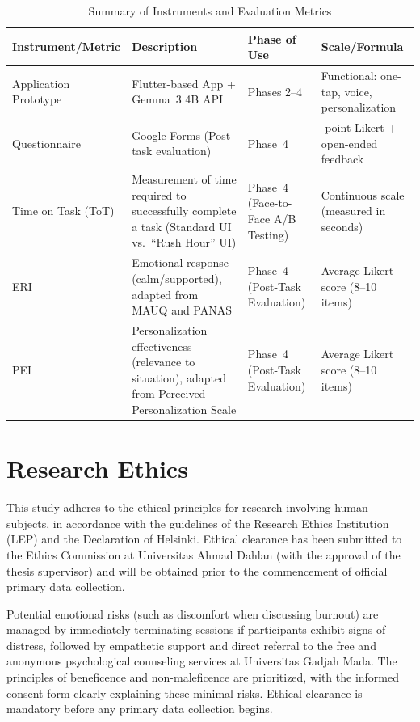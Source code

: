 \begin{table}[htbp]
    \centering
    \small
    \setlength{\tabcolsep}{4pt}
    \renewcommand{\arraystretch}{1.15}
    \caption{Summary of Instruments and Evaluation Metrics}
    \label{tab:instruments}
    \begin{tabular}{>{\raggedright\arraybackslash}p{} >{\raggedright\arraybackslash}p{} >{\raggedright\arraybackslash}p{} >{\raggedright\arraybackslash}p{}}
    \hline
    \textbf{Instrument/Metric} & \textbf{Description} & \textbf{Phase of Use} & \textbf{Scale/Formula} \\
    \hline \hline
    Application Prototype & Flutter-based App + Gemma~3 4B API & Phases 2--4 & Functional: one-tap, voice, personalization \\
    \hline
    Questionnaire & Google Forms (Post-task evaluation) & Phase~4 & 5-point Likert + open-ended feedback \\
    \hline
    Time on Task (ToT) & Measurement of time required to successfully complete a task (Standard UI vs.\ ``Rush Hour'' UI) & Phase~4 (Face-to-Face A/B Testing) & Continuous scale (measured in seconds) \\
    \hline
    ERI & Emotional response (calm/supported), adapted from MAUQ and PANAS & Phase~4 (Post-Task Evaluation) & Average Likert score (8--10 items) \\
    \hline
    PEI & Personalization effectiveness (relevance to situation), adapted from Perceived Personalization Scale & Phase~4 (Post-Task Evaluation) & Average Likert score (8--10 items) \\
    \hline
    \end{tabular}
\end{table}

\section{Research Ethics}

This study adheres to the ethical principles for research involving human subjects, in accordance with the guidelines of the Research Ethics Institution (LEP) and the Declaration of Helsinki. Ethical clearance has been submitted to the Ethics Commission at Universitas Ahmad Dahlan (with the approval of the thesis supervisor) and will be obtained prior to the commencement of official primary data collection.

Potential emotional risks (such as discomfort when discussing burnout) are managed by immediately terminating sessions if participants exhibit signs of distress, followed by empathetic support and direct referral to the free and anonymous psychological counseling services at Universitas Gadjah Mada. The principles of beneficence and non-maleficence are prioritized, with the informed consent form clearly explaining these minimal risks. Ethical clearance is mandatory before any primary data collection begins.

